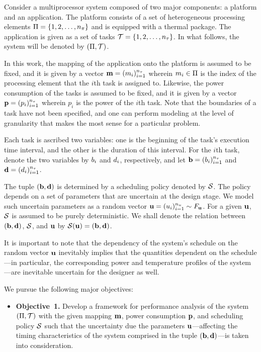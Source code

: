 Consider a multiprocessor system composed of two major components: a platform
and an application. The platform consists of a set of heterogeneous processing
elements $\Pi = \{ 1, 2, \dots, {n_\pi} \}$ and is equipped with a thermal
package. The application is given as a set of tasks $\mathcal{T} = \{ 1, 2, \dots,
{n_\tau} \}$. In what follows, the system will be denoted by $(\Pi, \mathcal{T})$.

In this work, the mapping of the application onto the platform is assumed to be
fixed, and it is given by a vector $\mathbf{m} = (m_i)_{i = 1}^{{n_\tau}}$ wherein $m_i
\in \Pi$ is the index of the processing element that the $i$th task is
assigned to. Likewise, the power consumption of the tasks is assumed to be
fixed, and it is given by a vector $\mathbf{p} = (p_i)_{i = 1}^{{n_\tau}}$ wherein $p_i$
is the power of the $i$th task. Note that the boundaries of a task have not been
specified, and one can perform modeling at the level of granularity that makes
the most sense for a particular problem.

Each task is ascribed two variables: one is the beginning of the task's
execution time interval, and the other is the duration of this interval. For the
$i$th task, denote the two variables by $b_i$ and $d_i$, respectively, and let
$\mathbf{b} = (b_i)_{i=1}^{{n_\tau}}$ and $\mathbf{d} = (d_i)_{i=1}^{{n_\tau}}$.

The tuple $(\mathbf{b}, \mathbf{d})$ is determined by a scheduling policy denoted by
$\mathcal{S}$. The policy depends on a set of parameters that are uncertain at the
design stage. We model such uncertain parameters as a random vector $\mathbf{u} =
(u_i)_{i = 1}^{n_u} \sim F_{\mathbf{u}}$. For a given $\mathbf{u}$, $\mathcal{S}$ is
assumed to be purely deterministic. We shall denote the relation between $(\mathbf{b},
\mathbf{d})$, $\mathcal{S}$, and $\mathbf{u}$ by $\mathcal{S}(\mathbf{u}) = (\mathbf{b}, \mathbf{d})$.

It is important to note that the dependency of the system's schedule on the
random vector $\mathbf{u}$ inevitably implies that the quantities dependent on the
schedule---in particular, the corresponding power and temperature profiles of
the system---are inevitable uncertain for the designer as well.

We pursue the following major objectives:
\begin{itemize}

\item {\bfseries Objective~1.} Develop a framework for performance analysis of
  the system $(\Pi, \mathcal{T})$ with the given mapping $\mathbf{m}$, power
  consumption $\mathbf{p}$, and scheduling policy $\mathcal{S}$ such that the
  uncertainty due the parameters $\mathbf{u}$---affecting the timing characteristics of
  the system comprised in the tuple $(\mathbf{b}, \mathbf{d})$---is taken into consideration.

\end{itemize}

